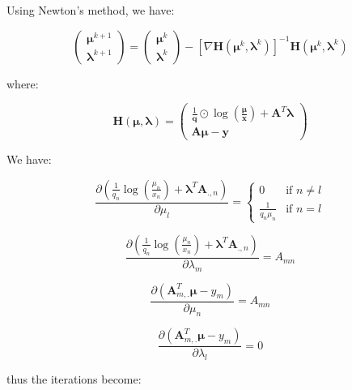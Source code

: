 \documentclass{tex/note}
\begin{document}
Using Newton's method, we have:

\begin{equation*}
\begin{pmatrix} \bm{\mu}^{k + 1} \\ \bm{\lambda}^{k + 1} \end{pmatrix} = \begin{pmatrix} \bm{\mu}^k \\ \bm{\lambda}^k \end{pmatrix} - \left[ \nabla \bm{H} \left( \bm{\mu}^k , \bm{\lambda}^k \right) \right] ^{-1} \bm{H} \left( \bm{\mu}^k , \bm{\lambda}^k \right)
\end{equation*}

where:

\begin{equation*}
\bm{H} \left( \bm{\mu} , \bm{\lambda} \right) = \begin{pmatrix} \frac{1}{\bm{q}} \odot \log \left( \frac{\bm{\mu}}{\bm{x}} \right) + \bm{A}^T \bm{\lambda} \\ \bm{A} \bm{\mu} - \bm{y} \end{pmatrix}
\end{equation*}

We have:

\begin{equation*}
\frac{\partial \left( \frac{1}{q_n} \log \left( \frac{\mu_n}{x_n} \right) + \bm{\lambda}^T \bm{A}_{.,n} \right)}{\partial \mu_l} =
\begin{cases}
0 & \text{if } n \neq l \\
\frac{1}{q_n \mu_n} & \text{if } n = l
\end{cases}
\end{equation*}

\begin{equation*}
\frac{\partial \left( \frac{1}{q_n} \log \left( \frac{\mu_n}{x_n} \right) + \bm{\lambda}^T \bm{A}_{.,n} \right)}{\partial \lambda_m} = A_{mn}
\end{equation*}

\begin{equation*}
\frac{\partial \left( \bm{A}_{m,.}^T \bm{\mu} - y_m \right)}{\partial \mu_n} = A_{mn}
\end{equation*}

\begin{equation*}
\frac{\partial \left( \bm{A}_{m,.}^T \bm{\mu} - y_m \right)}{\partial \lambda_l} = 0
\end{equation*}

thus the iterations become:
\end{document}
